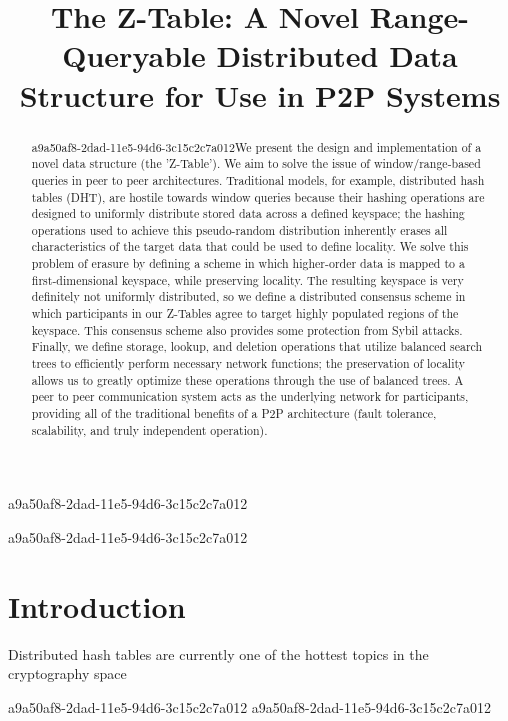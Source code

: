 \documentclass[12pt]{article}
\title{The Z-Table: A Novel Range-Queryable Distributed Data Structure for Use in P2P Systems}
\begin{document}
a9a50af8-2dad-11e5-94d6-3c15c2c7a012\maketitle

\begin{abstract}
a9a50af8-2dad-11e5-94d6-3c15c2c7a012We present the design and implementation of a novel data structure (the 'Z-Table'). We aim to solve the issue of window/range-based queries in peer to peer architectures. Traditional models, for example,  distributed hash tables (DHT), are hostile towards window queries because their hashing operations are designed to uniformly distribute stored data across a defined keyspace; the hashing operations used to achieve this pseudo-random distribution inherently erases all characteristics of the target data that could be used to define locality. We solve this problem of erasure by defining a scheme in which higher-order data is mapped to a first-dimensional keyspace, while preserving locality. The resulting keyspace is very definitely not uniformly distributed, so we define a distributed consensus scheme in which participants in our Z-Tables agree to target highly populated regions of the keyspace. This consensus scheme also provides some protection from Sybil attacks. Finally, we define storage, lookup, and deletion operations that utilize balanced search trees to efficiently perform necessary network functions; the preservation of locality allows us to greatly optimize these operations through the use of balanced trees. A peer to peer communication system acts as the underlying network for participants, providing all of the traditional benefits of a P2P architecture (fault tolerance, scalability, and truly independent operation).
\end{abstract}

a9a50af8-2dad-11e5-94d6-3c15c2c7a012
\newpage
\section{Introduction}
Distributed hash tables are currently one of the hottest topics in the cryptography space~\cite{Stoica:2001dj,Rowstron:2001ea,Ratnasamy:2001wn}

a9a50af8-2dad-11e5-94d6-3c15c2c7a012\printbibliography
a9a50af8-2dad-11e5-94d6-3c15c2c7a012
\end{document}
